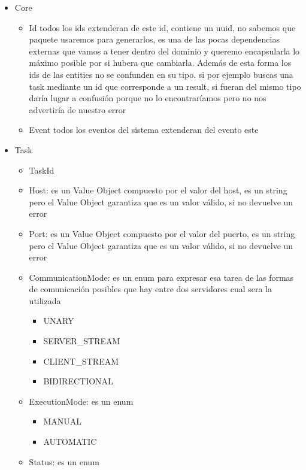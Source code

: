 \begin{itemize}
    \item Core
        \begin{itemize}
        \item Id todos los ids extenderan de este id, contiene un uuid, no sabemos que paquete usaremos para generarlos, es una de las pocas dependencias externas que vamos a tener dentro del dominio y queremo encapsularla lo máximo posible por si hubera que cambiarla. Además de esta forma los ids de las entities no se confunden en su tipo. si por ejemplo buscas una task mediante un id que corresponde a un result, si fueran del mismo tipo daría lugar a confusión porque no lo encontraríamos pero no nos advertiría de nuestro error
        \item Event todos los eventos del sistema extenderan del evento este
    \end{itemize}
    \item Task
        \begin{itemize}
        \item TaskId
        \item Host: es un Value Object compuesto por el valor del host, es un string pero el Value Object garantiza que es un valor válido, si no devuelve un error
        \item Port: es un Value Object compuesto por el valor del puerto, es un string pero el Value Object garantiza que es un valor válido, si no devuelve un error
        \item CommunicationMode: es un enum para expresar esa tarea de las formas de comunicación posibles que hay entre dos servidores cual sera la utilizada
            \begin{itemize}
                \item UNARY
                \item SERVER\_STREAM
                \item CLIENT\_STREAM
                \item BIDIRECTIONAL
            \end{itemize}
        \item ExecutionMode: es un enum
            \begin{itemize}
                \item MANUAL
                \item AUTOMATIC
            \end{itemize}
        \item Status: es un enum
            \begin{itemize}

\end{itemize}
\end{itemize}
\end{itemize}
